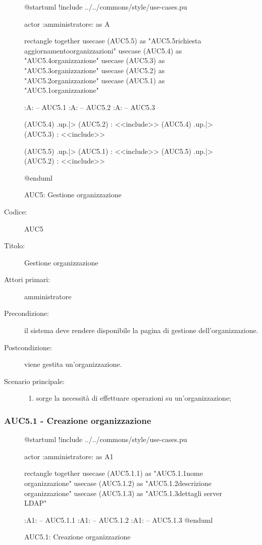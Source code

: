\documentclass[../../../analisi-dei-requisiti.tex]{subfiles}
\begin{document}
\begin{figure}[H]
  \centering
  \begin{plantuml}
  @startuml
  !include ../../commons/style/use-cases.pu

  actor :amministratore: as A

  rectangle {
    together {
      usecase (AUC5.5) as "AUC5.5\nInvio richiesta aggiornamento\nlista organizzazioni"
      usecase (AUC5.4) as "AUC5.4\nSeleziona organizzazione"
      usecase (AUC5.3) as "AUC5.3\nModifica organizzazione"
      usecase (AUC5.2) as "AUC5.2\nEliminazione organizzazione"
      usecase (AUC5.1) as "AUC5.1\nCreazione organizzazione"
    }
  }

  :A: -- AUC5.1
  :A: -- AUC5.2
  :A: -- AUC5.3

  (AUC5.4) .up.|> (AUC5.2) : <<include>>
  (AUC5.4) .up.|> (AUC5.3) : <<include>>

  (AUC5.5) .up.|> (AUC5.1) : <<include>>
  (AUC5.5) .up.|> (AUC5.2) : <<include>>

  @enduml
  \end{plantuml}
  \caption{AUC5: Gestione organizzazione}
  \label{fig:AUC5}
\end{figure}

\begin{description}
  \item[Codice:] AUC5
  \item[Titolo:] Gestione organizzazione
  \item[Attori primari:] amministratore
  \item[Precondizione:] il sistema deve rendere disponibile la pagina di gestione dell'organizzazione.
  \item[Postcondizione:] viene gestita un'organizzazione.
  \item[Scenario principale:]
  \begin{enumerate}
    \item sorge la necessità di effettuare operazioni su un'organizzazione;
  \end{enumerate}
\end{description}

\subsubsection{AUC5.1 - Creazione organizzazione}%
  \label{subs:AUC5.1}

  \begin{figure}[H]
    \centering
    \begin{plantuml}
    @startuml
    !include ../../commons/style/use-cases.pu

    actor :amministratore: as A1

    rectangle {
      together {
        usecase (AUC5.1.1) as "AUC5.1.1\nInserisci nome organizzazione"
        usecase (AUC5.1.2) as "AUC5.1.2\nInserisci descrizione organizzazione"
        usecase (AUC5.1.3) as "AUC5.1.3\nConfigurazione dettagli server LDAP"
      }
    }

    :A1: -- AUC5.1.1
    :A1: -- AUC5.1.2
    :A1: -- AUC5.1.3
    @enduml
    \end{plantuml}
    \caption{AUC5.1: Creazione organizzazione}
    \label{fig:AUC5_1}
  \end{figure}
\end{document}
